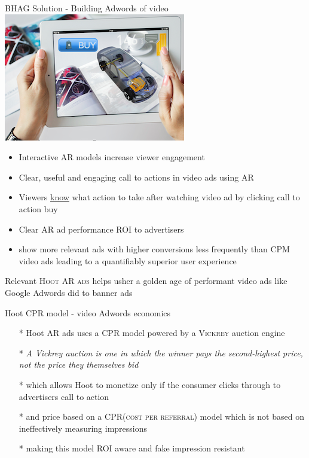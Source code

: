 \documentclass[12pt]{beamer}
\begin{document}
\begin{frame}[fragile]{BHAG Solution -  Building Adwords of video \includegraphics[scale=.1]{static/arad/arad5} }
\begin{itemize}[<+-| alert@+>]
\item Interactive AR models increase viewer engagement
\item Clear, useful and engaging call to actions in video ads using AR
\item Viewers \underline{know} what action to take after watching video ad by clicking call to action buy 
\item Clear AR ad performance \textsc{ROI} to advertisers 
\item show more relevant ads with higher conversions less frequently than CPM video ads leading to a quantifiably superior user experience 
\end{itemize}
\pause
Relevant \textsc{Hoot AR ads} helps usher a golden age of performant video ads like Google Adwords did to banner ads


\end{frame}

\begin{frame}[t]{Hoot CPR model - video Adwords economics}
\begin{itemize}[<+-| alert@+>]
\item[*] Hoot AR ads uses a CPR model powered by a \textsc{Vickrey} auction engine
\item[*]\emph{A Vickrey auction is one in which the winner pays the second-highest price, not the price they themselves bid}
\item[*]which allows Hoot to monetize only if the consumer clicks through to advertisers call to action
\item[*]and price based on a \textsc{CPR(cost per referral)} model which is not based on ineffectively measuring impressions
\item[*]making this model ROI aware and fake impression resistant
\end{itemize}
\end{frame}
\end{document}

